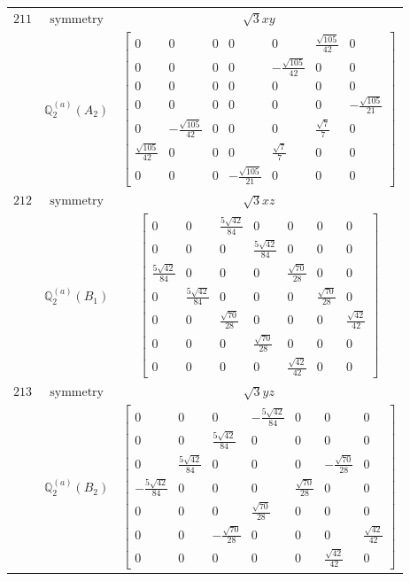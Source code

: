 \documentclass[fleqn,8pt,landscape]{jsarticle}
\begin{document}
\begin{longtable}{ccc}
$ 211 $ & $ \text{symmetry} $ & $ \sqrt{3} x y $ \\
$  $ & $ \mathbb{Q}_{2}^{(a)}(A_{2}) $ & $ \begin{bmatrix} 0 & 0 & 0 & 0 & 0 & \frac{\sqrt{105}}{42} & 0 \\ 0 & 0 & 0 & 0 & - \frac{\sqrt{105}}{42} & 0 & 0 \\ 0 & 0 & 0 & 0 & 0 & 0 & 0 \\ 0 & 0 & 0 & 0 & 0 & 0 & - \frac{\sqrt{105}}{21} \\ 0 & - \frac{\sqrt{105}}{42} & 0 & 0 & 0 & \frac{\sqrt{7}}{7} & 0 \\ \frac{\sqrt{105}}{42} & 0 & 0 & 0 & \frac{\sqrt{7}}{7} & 0 & 0 \\ 0 & 0 & 0 & - \frac{\sqrt{105}}{21} & 0 & 0 & 0 \end{bmatrix} $ \\ \hline
$ 212 $ & $ \text{symmetry} $ & $ \sqrt{3} x z $ \\
$  $ & $ \mathbb{Q}_{2}^{(a)}(B_{1}) $ & $ \begin{bmatrix} 0 & 0 & \frac{5 \sqrt{42}}{84} & 0 & 0 & 0 & 0 \\ 0 & 0 & 0 & \frac{5 \sqrt{42}}{84} & 0 & 0 & 0 \\ \frac{5 \sqrt{42}}{84} & 0 & 0 & 0 & \frac{\sqrt{70}}{28} & 0 & 0 \\ 0 & \frac{5 \sqrt{42}}{84} & 0 & 0 & 0 & \frac{\sqrt{70}}{28} & 0 \\ 0 & 0 & \frac{\sqrt{70}}{28} & 0 & 0 & 0 & \frac{\sqrt{42}}{42} \\ 0 & 0 & 0 & \frac{\sqrt{70}}{28} & 0 & 0 & 0 \\ 0 & 0 & 0 & 0 & \frac{\sqrt{42}}{42} & 0 & 0 \end{bmatrix} $ \\ \hline
$ 213 $ & $ \text{symmetry} $ & $ \sqrt{3} y z $ \\
$  $ & $ \mathbb{Q}_{2}^{(a)}(B_{2}) $ & $ \begin{bmatrix} 0 & 0 & 0 & - \frac{5 \sqrt{42}}{84} & 0 & 0 & 0 \\ 0 & 0 & \frac{5 \sqrt{42}}{84} & 0 & 0 & 0 & 0 \\ 0 & \frac{5 \sqrt{42}}{84} & 0 & 0 & 0 & - \frac{\sqrt{70}}{28} & 0 \\ - \frac{5 \sqrt{42}}{84} & 0 & 0 & 0 & \frac{\sqrt{70}}{28} & 0 & 0 \\ 0 & 0 & 0 & \frac{\sqrt{70}}{28} & 0 & 0 & 0 \\ 0 & 0 & - \frac{\sqrt{70}}{28} & 0 & 0 & 0 & \frac{\sqrt{42}}{42} \\ 0 & 0 & 0 & 0 & 0 & \frac{\sqrt{42}}{42} & 0 \end{bmatrix} $ \\ \hline

\end{longtable}
\end{document}
